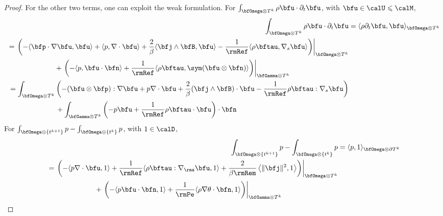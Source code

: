 \begin{proof}
            For the other two terms, one can exploit the weak formulation. For $\int_{\bfOmega\otimes T^{k}}\rho\bfu\cdot\partial_{t}\bfu$, with $\bfu  \in  \calU  \leqslant  \calM$,
            \begin{align}
                \int_{\bfOmega\otimes T^{k}}\rho\bfu\cdot\partial_{t}\bfu  &=  \langle\rho\partial_{t}\bfu, \bfu\rangle_{\bfOmega\otimes T^{k}}  \\
                \begin{split}
                    &=  \left.\left(- \langle\bfp\cdot\nabla\bfu, \bfu\rangle + \langle p, \nabla\cdot\bfu\rangle + \frac{2}{\beta}\langle\bfj\wedge\bfB, \bfu\rangle - \frac{1}{\rmRef}\langle\rho\bftau, \nabla_{s}\bfu\rangle\right)\right|_{\bfOmega\otimes T^{k}}  \\
                    &\;\;\;\;\;\;\;\;\;\;\;\;\;\;\;\;\;\;\;\;\;\;\;\;  + \left.\left(- \langle p, \bfu\cdot\bfn\rangle + \frac{1}{\rmRef}\langle\rho\bftau, \sym(\bfu\otimes\bfn)\rangle\right)\right|_{\bfGamma\otimes T^{k}}
                \end{split}  \\
                \begin{split}
                    &=  \int_{\bfOmega\otimes T^{k}}\left(- (\bfu\otimes\bfp):\nabla\bfu + p\nabla\cdot\bfu + \frac{2}{\beta}(\bfj\wedge\bfB)\cdot\bfu - \frac{1}{\rmRef}\rho\bftau:\nabla_{s}\bfu\right)  \\
                    &\;\;\;\;\;\;\;\;\;\;\;\;\;\;\;\;\;\;\;\;\;\;\;\;  + \int_{\bfGamma\otimes T^{k}}\left(- p\bfu + \frac{1}{\rmRef}\rho\bftau\cdot\bfu\right)\cdot\bfn
                \end{split}
            \end{align}
            For $\int_{\bfOmega\otimes\left\{t^{k + 1}\right\}}p - \int_{\bfOmega\otimes\left\{t^{k}\right\}}p$, with $1  \in  \calD$,
            \begin{align}
                \int_{\bfOmega\otimes\left\{t^{k + 1}\right\}}p - \int_{\bfOmega\otimes\left\{t^{k}\right\}}p  &=  \langle p, 1\rangle_{\bfOmega\otimes\partial T^{k}}  \\
                \begin{split}
                    &=  \left.\left(- \langle p\nabla\cdot\bfu, 1\rangle + \frac{1}{\rmRef}\langle\rho\bftau:\nabla_{\rms}\bfu, 1\rangle + \frac{2}{\beta\rmRem}\left\langle\|\bfj\|^{2}, 1\right\rangle\right)\right|_{\bfOmega\otimes T^{k}}  \\
                    &\;\;\;\;\;\;\;\;\;\;\;\;\;\;\;\;\;\;\;\;\;\;\;\;+ \left.\left(- \langle p\bfu\cdot\bfn, 1\rangle + \frac{1}{\rmPe}\langle\rho\nabla\theta\cdot\bfn, 1\rangle\right)\right|_{\bfGamma\otimes T^{k}}

\end{split}
\end{align}
\end{proof}
